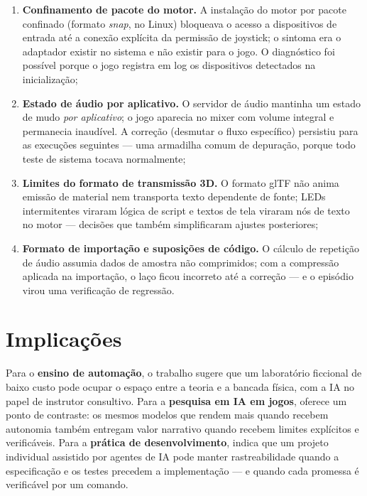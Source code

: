 \begin{enumerate}
  \item \textbf{Confinamento de pacote do motor.} A instalação do motor por
  pacote confinado (formato \emph{snap}, no Linux) bloqueava o acesso a
  dispositivos de entrada até a conexão explícita da permissão de joystick;
  o sintoma era o adaptador existir no sistema e não existir para o jogo. O
  diagnóstico foi possível porque o jogo registra em log os dispositivos
  detectados na inicialização;
  \item \textbf{Estado de áudio por aplicativo.} O servidor de áudio mantinha
  um estado de mudo \emph{por aplicativo}; o jogo aparecia no mixer com
  volume integral e permanecia inaudível. A correção (desmutar o fluxo
  específico) persistiu para as execuções seguintes --- uma armadilha comum
  de depuração, porque todo teste de sistema tocava normalmente;
  \item \textbf{Limites do formato de transmissão 3D.} O formato glTF não
  anima emissão de material nem transporta texto dependente de fonte; LEDs
  intermitentes viraram lógica de script e textos de tela viraram nós de
  texto no motor --- decisões que também simplificaram ajustes posteriores;
  \item \textbf{Formato de importação e suposições de código.} O cálculo de
  repetição de áudio assumia dados de amostra não comprimidos; com a
  compressão aplicada na importação, o laço ficou incorreto até a correção
  --- e o episódio virou uma verificação de regressão.
\end{enumerate}

\section{Implicações}
\label{sec:implicacoes}

Para o \textbf{ensino de automação}, o trabalho sugere que um laboratório
ficcional de baixo custo pode ocupar o espaço entre a teoria e a bancada
física, com a IA no papel de instrutor consultivo. Para a \textbf{pesquisa em
IA em jogos}, oferece um ponto de contraste: os mesmos modelos que rendem mais
quando recebem autonomia também entregam valor narrativo quando recebem
limites explícitos e verificáveis. Para a \textbf{prática de desenvolvimento},
indica que um projeto individual assistido por agentes de IA pode manter
rastreabilidade quando a especificação e os testes precedem a implementação
--- e quando cada promessa é verificável por um comando.

